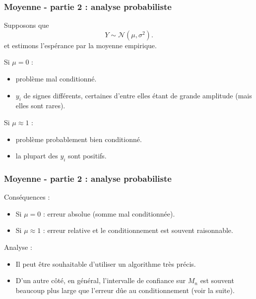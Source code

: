 \documentclass{beamer}
\begin{document}
\begin{frame}[containsverbatim]
\frametitle{Moyenne - partie 2 : analyse probabiliste}

Supposons que 
$$
Y\sim \mathcal{N}(\mu,\sigma^2).
$$
et estimons l'espérance par la moyenne empirique.

Si $\mu=0$ :
\begin{itemize}
\item problème mal conditionné.
\item $y_i$ de signes différents, 
certaines d'entre elles étant de grande amplitude (mais elles sont 
rares).
\end{itemize}

Si $\mu\approx 1$ :
\begin{itemize}
\item problème probablement bien conditionné.
\item la plupart des $y_i$ sont positifs.
\end{itemize}

\end{frame}


\begin{frame}[containsverbatim]
\frametitle{Moyenne - partie 2 : analyse probabiliste}

Conséquences :
\begin{itemize}
\item Si $\mu=0$ : erreur absolue (somme mal conditionnée). 
\item Si $\mu\approx 1$ : erreur relative et 
le conditionnement est souvent raisonnable. 
\end{itemize}

Analyse :
\begin{itemize}
\item Il peut être souhaitable d'utiliser un algorithme très précis.
\item D'un autre côté, en général, l'intervalle de confiance sur 
$M_n$ est souvent beaucoup plus large que l'erreur dûe au 
conditionnement (voir la suite). 
\end{itemize}

\end{frame}

\end{document}
